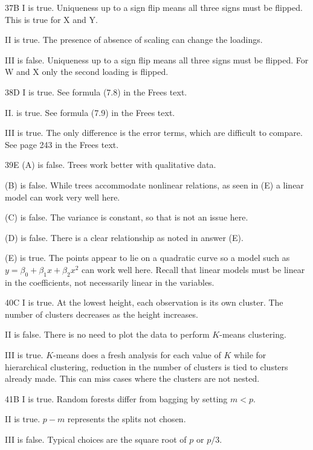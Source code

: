 \begin{solution}{37}{B}
I is true. Uniqueness up to a sign flip means all three signs must be flipped. This is true for X and Y.

II is true. The presence of absence of scaling can change the loadings.

III is false. Uniqueness up to a sign flip means all three signs must be flipped. For W and X only the second loading is flipped.
\end{solution}

\begin{solution}{38}{D}
I is true. See formula (7.8) in the Frees text.

II. is true. See formula (7.9) in the Frees text.

III is true. The only difference is the error terms, which are difficult to compare. See page 243 in the Frees text.
\end{solution}

\begin{solution}{39}{E}
(A) is false. Trees work better with qualitative data.

(B) is false. While trees accommodate nonlinear relations, as seen in (E) a linear model can work very well here.

(C) is false. The variance is constant, so that is not an issue here.

(D) is false. There is a clear relationship as noted in answer (E).

(E) is true. The points appear to lie on a quadratic curve so a model such as $y = \beta_0 + \beta_1 x + \beta_2 x^2$ can work well here. Recall that linear models must be linear in the coefficients, not necessarily linear in the variables.
\end{solution}

\begin{solution}{40}{C}
I is true. At the lowest height, each observation is its own cluster. The number of clusters decreases as the height increases.

II is false. There is no need to plot the data to perform $K$-means clustering.

III is true. $K$-means does a fresh analysis for each value of $K$ while for hierarchical clustering, reduction in the number of clusters is tied to clusters already made. This can miss cases where the clusters are not nested.
\end{solution}
\begin{solution}{41}{B}
I is true. Random forests differ from bagging by setting $m < p$.

II is true. $p - m$ represents the splits not chosen.

III is false. Typical choices are the square root of $p$ or $p/3$.
\end{solution}

